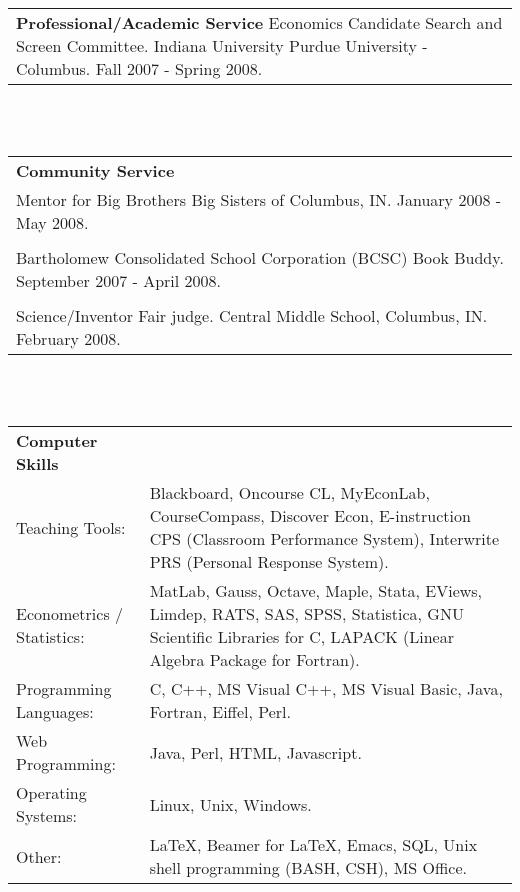 \begin{tabular}{p{5.5in}}
\textbf{Professional/Academic Service} \newline
Economics Candidate Search and Screen Committee.  Indiana University Purdue University - Columbus. Fall 2007 - Spring 2008.
\end{tabular} \\ \\

\begin{tabular}{p{5.5in}}
\textbf{Community Service} \\
Mentor for Big Brothers Big Sisters of Columbus, IN.  January 2008 - May 2008.\\\\
Bartholomew Consolidated School Corporation (BCSC) Book Buddy.  September 2007 - April 2008.\\\\
Science/Inventor Fair judge.  Central Middle School, Columbus, IN.  February 2008. 
\end{tabular} \\ \\

\begin{tabular}{p{2in} p{3.3in}}
\textbf{Computer Skills} & \\
Teaching Tools: & Blackboard, Oncourse CL, MyEconLab, CourseCompass, Discover Econ, E-instruction CPS (Classroom Performance System), Interwrite PRS (Personal Response System). \\
Econometrics / Statistics: & MatLab, Gauss, Octave, Maple, Stata, EViews, Limdep, RATS, SAS, SPSS, Statistica, GNU Scientific Libraries for C, LAPACK (Linear Algebra Package for Fortran). \\
Programming Languages: & C, C++, MS Visual C++, MS Visual Basic, Java, Fortran, Eiffel, Perl. \\
Web Programming: & Java, Perl, HTML, Javascript. \\
Operating Systems: & Linux, Unix, Windows.\\
Other: & \LaTeX, Beamer for \LaTeX, Emacs, SQL, Unix shell programming (BASH, CSH), MS Office. \\
\end{tabular} \\ \\

